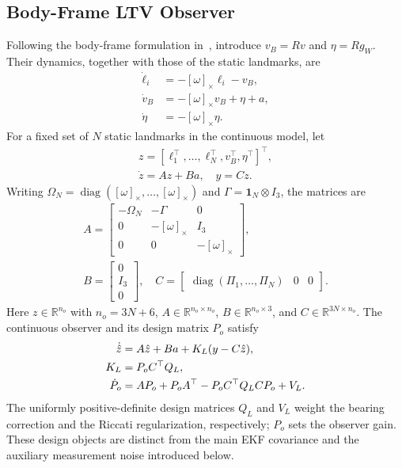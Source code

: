 \documentclass[a4paper,runningheads,twocolumn]{llncs}
\newcommand{\R}{\mathbb{R}}
\newcommand{\sk}[1]{[#1]_{\times}}
\newcommand{\diag}{\operatorname{diag}}
\begin{document}
\subsection{Body-Frame LTV Observer}
Following the body-frame formulation in~\cite{wang2024}, introduce $v_B=Rv$ and $\eta=Rg_W$. Their dynamics, together with those of the static landmarks, are
\begin{equation}
 \begin{aligned}
 \dot\ell_i&=-\sk{\omega}\ell_i-v_B,\\
 \dot v_B&=-\sk{\omega}v_B+\eta+a,\\
 \dot\eta&=-\sk{\omega}\eta .
 \end{aligned}
 \label{eq:ltvdynamics}
\end{equation}
For a fixed set of $N$ static landmarks in the continuous model, let
\begin{equation}
 \begin{gathered}
 z=[\ell_1^\top,\ldots,\ell_N^\top,v_B^\top,\eta^\top]^\top,\\
 \dot z=Az+Ba,\quad y=Cz .
 \end{gathered}
 \label{eq:ltvstate}
\end{equation}
Writing $\Omega_N=\diag(\sk{\omega},\ldots,\sk{\omega})$ and
$\Gamma=\bm{1}_N\otimes I_3$, the matrices are
\begin{equation}
 \begin{gathered}
 A=\begin{bmatrix}
 -\Omega_N&-\Gamma&0\\
 0&-\sk{\omega}&I_3\\
 0&0&-\sk{\omega}
 \end{bmatrix},\\
 B=\begin{bmatrix}0\\I_3\\0\end{bmatrix},\quad
 C=\begin{bmatrix}\diag(\Pi_1,\ldots,\Pi_N)&0&0\end{bmatrix}.
 \end{gathered}
 \label{eq:ltvmatrices}
\end{equation}
Here $z\in\R^{n_o}$ with $n_o=3N+6$, $A\in\R^{n_o\times n_o}$, $B\in\R^{n_o\times3}$, and $C\in\R^{3N\times n_o}$. The continuous observer and its design matrix $P_o$ satisfy
\begin{align}
 \dot{\hat z}&=A\hat z+Ba+K_L(y-C\hat z),\label{eq:observer}\\
 K_L&=P_oC^\top Q_L, \notag\\
 \dot P_o&=AP_o+P_oA^\top-P_oC^\top Q_LCP_o+V_L .
 \label{eq:riccati}
\end{align}
The uniformly positive-definite design matrices $Q_L$ and $V_L$ weight the bearing correction and the Riccati regularization, respectively; $P_o$ sets the observer gain. These design objects are distinct from the main EKF covariance and the auxiliary measurement noise introduced below.
\end{document}
